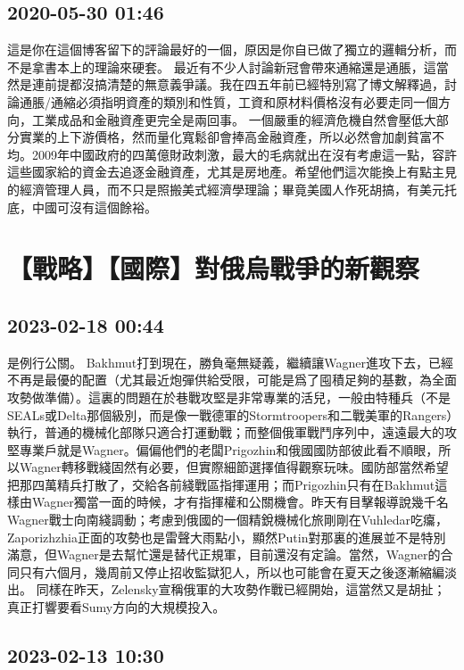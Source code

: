 \documentclass[twocolumn]{ctexart}
\begin{document}
\subsection*{2020-05-30 01:46}

這是你在這個博客留下的評論最好的一個，原因是你自已做了獨立的邏輯分析，而不是拿書本上的理論來硬套。
最近有不少人討論新冠會帶來通縮還是通脹，這當然是連前提都沒搞清楚的無意義爭議。我在四五年前已經特別寫了博文解釋過，討論通脹/通縮必須指明資產的類別和性質，工資和原材料價格沒有必要走同一個方向，工業成品和金融資產更完全是兩回事。
一個嚴重的經濟危機自然會壓低大部分實業的上下游價格，然而量化寬鬆卻會捧高金融資產，所以必然會加劇貧富不均。2009年中國政府的四萬億財政刺激，最大的毛病就出在沒有考慮這一點，容許這些國家給的資金去追逐金融資產，尤其是房地產。希望他們這次能換上有點主見的經濟管理人員，而不只是照搬美式經濟學理論；畢竟美國人作死胡搞，有美元托底，中國可沒有這個餘裕。
\section*{【戰略】【國際】對俄烏戰爭的新觀察}
\subsection*{2023-02-18 00:44}

是例行公關。
Bakhmut打到現在，勝負毫無疑義，繼續讓Wagner進攻下去，已經不再是最優的配置（尤其最近炮彈供給受限，可能是爲了囤積足夠的基數，為全面攻勢做準備）。這裏的問題在於巷戰攻堅是非常專業的活兒，一般由特種兵（不是SEALs或Delta那個級別，而是像一戰德軍的Stormtroopers和二戰美軍的Rangers）執行，普通的機械化部隊只適合打運動戰；而整個俄軍戰鬥序列中，遠遠最大的攻堅專業戶就是Wagner。偏偏他們的老闆Prigozhin和俄國國防部彼此看不順眼，所以Wagner轉移戰綫固然有必要，但實際細節選擇值得觀察玩味。國防部當然希望把那四萬精兵打散了，交給各前綫戰區指揮運用；而Prigozhin只有在Bakhmut這樣由Wagner獨當一面的時候，才有指揮權和公關機會。昨天有目擊報導說幾千名Wagner戰士向南綫調動；考慮到俄國的一個精銳機械化旅剛剛在Vuhledar吃癟，Zaporizhzhia正面的攻勢也是雷聲大雨點小，顯然Putin對那裏的進展並不是特別滿意，但Wagner是去幫忙還是替代正規軍，目前還沒有定論。當然，Wagner的合同只有六個月，幾周前又停止招收監獄犯人，所以也可能會在夏天之後逐漸縮編淡出。
同樣在昨天，Zelensky宣稱俄軍的大攻勢作戰已經開始，這當然又是胡扯；真正打響要看Sumy方向的大規模投入。
\subsection*{2023-02-13 10:30}
\end{document}
